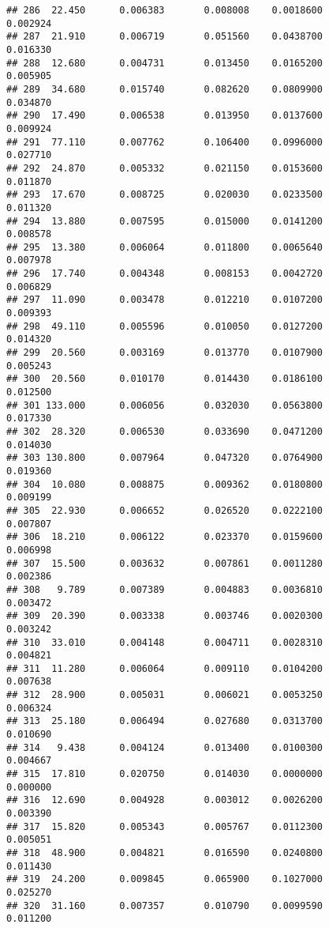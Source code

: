 \documentclass[
]{article}
\begin{document}
\begin{verbatim}
## 286  22.450      0.006383       0.008008    0.0018600          0.002924
## 287  21.910      0.006719       0.051560    0.0438700          0.016330
## 288  12.680      0.004731       0.013450    0.0165200          0.005905
## 289  34.680      0.015740       0.082620    0.0809900          0.034870
## 290  17.490      0.006538       0.013950    0.0137600          0.009924
## 291  77.110      0.007762       0.106400    0.0996000          0.027710
## 292  24.870      0.005332       0.021150    0.0153600          0.011870
## 293  17.670      0.008725       0.020030    0.0233500          0.011320
## 294  13.880      0.007595       0.015000    0.0141200          0.008578
## 295  13.380      0.006064       0.011800    0.0065640          0.007978
## 296  17.740      0.004348       0.008153    0.0042720          0.006829
## 297  11.090      0.003478       0.012210    0.0107200          0.009393
## 298  49.110      0.005596       0.010050    0.0127200          0.014320
## 299  20.560      0.003169       0.013770    0.0107900          0.005243
## 300  20.560      0.010170       0.014430    0.0186100          0.012500
## 301 133.000      0.006056       0.032030    0.0563800          0.017330
## 302  28.320      0.006530       0.033690    0.0471200          0.014030
## 303 130.800      0.007964       0.047320    0.0764900          0.019360
## 304  10.080      0.008875       0.009362    0.0180800          0.009199
## 305  22.930      0.006652       0.026520    0.0222100          0.007807
## 306  18.210      0.006122       0.023370    0.0159600          0.006998
## 307  15.500      0.003632       0.007861    0.0011280          0.002386
## 308   9.789      0.007389       0.004883    0.0036810          0.003472
## 309  20.390      0.003338       0.003746    0.0020300          0.003242
## 310  33.010      0.004148       0.004711    0.0028310          0.004821
## 311  11.280      0.006064       0.009110    0.0104200          0.007638
## 312  28.900      0.005031       0.006021    0.0053250          0.006324
## 313  25.180      0.006494       0.027680    0.0313700          0.010690
## 314   9.438      0.004124       0.013400    0.0100300          0.004667
## 315  17.810      0.020750       0.014030    0.0000000          0.000000
## 316  12.690      0.004928       0.003012    0.0026200          0.003390
## 317  15.820      0.005343       0.005767    0.0112300          0.005051
## 318  48.900      0.004821       0.016590    0.0240800          0.011430
## 319  24.200      0.009845       0.065900    0.1027000          0.025270
## 320  31.160      0.007357       0.010790    0.0099590          0.011200

\end{verbatim}
\end{document}
